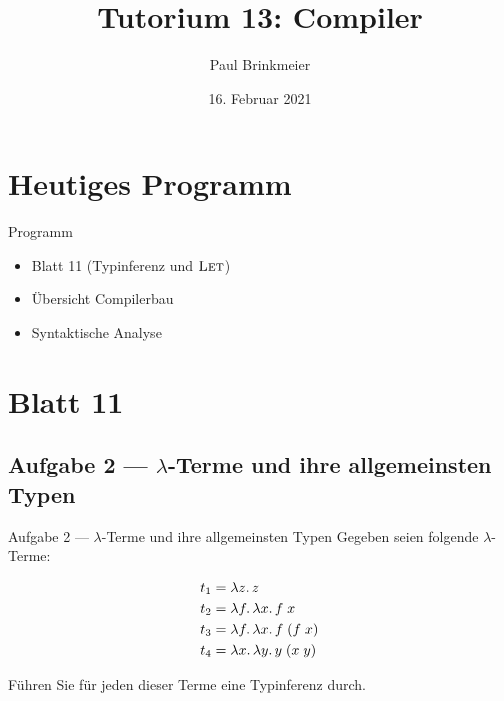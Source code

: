 \documentclass{beamer}
\title{Tutorium 13: Compiler}
\author{Paul Brinkmeier}
\institute{Tutorium Programmierparadigmen am KIT}
\date{16. Februar 2021}
\begin{document}
\begin{frame}
	\titlepage
\end{frame}

\section{Heutiges Programm}

\begin{frame}{Programm}
	\begin{itemize}
          \item Blatt 11 (Typinferenz und $\textsc{Let}$)
          \item Übersicht Compilerbau
          \item Syntaktische Analyse
	\end{itemize}
\end{frame}

\section{Blatt 11}

\subsection{Aufgabe 2 --- $\lambda$-Terme und ihre allgemeinsten Typen}

\begin{frame}{Aufgabe 2 --- $\lambda$-Terme und ihre allgemeinsten Typen}
  Gegeben seien folgende $\lambda$-Terme:

  \begin{align*}
    t_1 &= \lambda z.\, z \\
    t_2 &= \lambda f.\, \lambda x.\, f\;x \\
    t_3 &= \lambda f.\, \lambda x.\, f\;(f\;x) \\
    t_4 &= \lambda x.\, \lambda y.\, y\;(x\;y)
  \end{align*}

  Führen Sie für jeden dieser Terme eine Typinferenz durch.
\end{frame}
\end{document}
